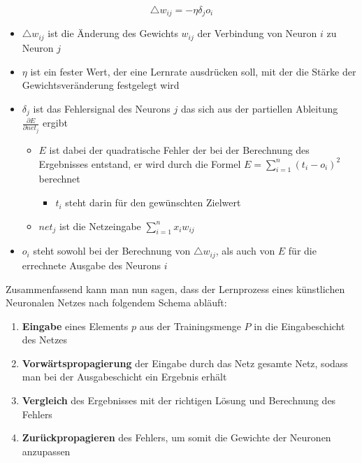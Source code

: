 \begin{equation}
\triangle w_{ij} = -\eta\delta_jo_i
\label{eq:BackProb}
\end{equation}

\begin{itemize}
\item \(\triangle w_{ij}\) ist die Änderung des Gewichts \(w_{ij}\) der Verbindung von Neuron \(i\) zu Neuron \(j\)
\item \(\eta\)  ist ein fester Wert, der eine Lernrate ausdrücken soll, mit der die Stärke der Gewichtsveränderung festgelegt wird
\item \(\delta_j\) ist das Fehlersignal des Neurons \(j\) das sich aus der partiellen Ableitung \(\frac{\partial E}{\partial net_j}\) ergibt\\
\begin{itemize}
\item \(E\) ist dabei der quadratische Fehler der bei der Berechnung des Ergebnisses entstand, er wird durch die Formel \(E = \sum \limits_{i=1}^n (t_i - o_i)^2\) berechnet
\begin{itemize}
\item \(t_i\) steht darin für den gewünschten Zielwert
\end{itemize}
\item \(net_j\) ist die Netzeingabe \(\sum \limits_{i=1}^n x_iw_{ij}\)
\end{itemize}

\item \(o_i\) steht sowohl bei der Berechnung von \(\triangle w_{ij}\), als auch von \(E\) für die errechnete Ausgabe des Neurons \(i\)
\end{itemize}

Zusammenfassend kann man nun sagen, dass der Lernprozess eines künstlichen Neuronalen Netzes nach folgendem Schema abläuft:

\begin{enumerate}
\item \textbf{Eingabe} eines Elements \(p\) aus der Trainingsmenge \(P\) in die Eingabeschicht des Netzes
\item \textbf{Vorwärtspropagierung} der Eingabe durch das Netz gesamte Netz, sodass man bei der Ausgabeschicht ein Ergebnis erhält
\item \textbf{Vergleich} des Ergebnisses mit der richtigen Lösung und Berechnung des Fehlers
\item \textbf{Zurückpropagieren} des Fehlers, um somit die Gewichte der Neuronen anzupassen
\end{enumerate}

